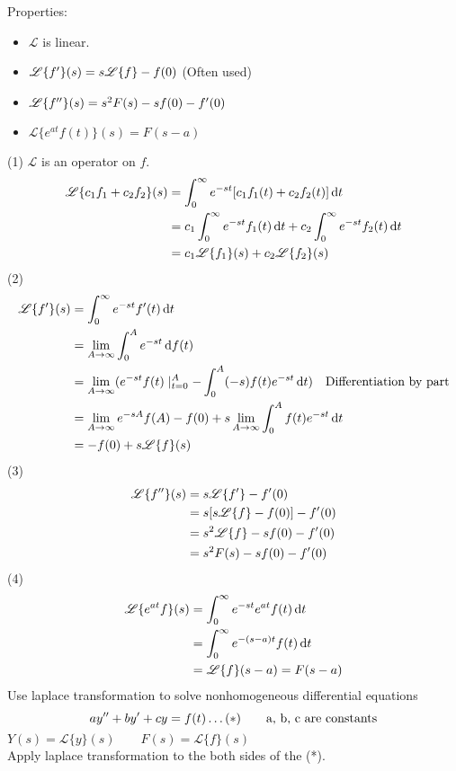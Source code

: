 Properties:
\begin{itemize}
\item $\mathscr{L}$ is linear.
\item $\mathscr{L}\{f^{\prime}\}(s)=s\mathscr{L}\{f\}-f(0)$ (Often used)
\item $\mathscr{L}\{f^{\prime\prime}\}(s)=s^2F(s)-sf(0)-f^{\prime}(0)$
\item $\mathscr{L}\{e^{at}f(t)\}(s)=F(s-a)$
\end{itemize}
(1) $\mathscr{L}$ is an operator on $f$.
\[\begin{aligned}
\mathscr{L}\{c_1f_1+c_2f_2\}(s)&=\int_0^\infty e^{-st}[c_1f_1(t)+c_2f_2(t)]\,\mathrm{d} t\\
&=c_1\int_0^\infty e^{-st}f_1(t)\,\mathrm{d} t+c_2\int_0^\infty e^{-st}f_2(t)\,\mathrm{d} t\\
&=c_1\mathscr{L}\{f_1\}(s)+c_2\mathscr{L}\{f_2\}(s)
\end{aligned}
\]
(2)
\[\begin{aligned}
\mathscr{L}\{f^{\prime}\}(s)&=\int_0^\infty e^{-st}f^{\prime}(t)\,\mathrm{d} t\\
&=\lim_{A\rightarrow\infty}\int_0^Ae^{-st}\,\mathrm{d} f(t)\\
&=\lim_{A\rightarrow\infty}(e^{-st}f(t)\mid_{t=0}^A-\int_0^A(-s)f(t)e^{-st}\,\mathrm{d} t)\quad\text{Differentiation by part}\\
&=\lim_{A\rightarrow\infty}e^{-sA}f(A)-f(0)+s\lim_{A\rightarrow\infty}\int_0^Af(t)e^{-st}\,\mathrm{d} t\\
&=-f(0)+s\mathscr{L}\{f\}(s)
\end{aligned}
\]
(3)\[\begin{aligned}
\mathscr{L}\{f^{\prime\prime}\}(s)&=s\mathscr{L}\{f^{\prime}\}-f^{\prime}(0)\\
&=s[s\mathscr{L}\{f\}-f(0)]-f^{\prime}(0)\\
&=s^2\mathscr{L}\{f\}-sf(0)-f^{\prime}(0)\\
&=s^2F(s)-sf(0)-f^{\prime}(0)
\end{aligned}
\]
(4)
\[\begin{aligned}
\mathscr{L}\{e^{at}f\}(s)&=\int_0^\infty e^{-st}e^{at}f(t)\,\mathrm{d} t\\
&=\int_0^\infty e^{-(s-a)t}f(t)\,\mathrm{d} t\\
&=\mathscr{L}\{f\}(s-a)=F(s-a)
\end{aligned}\]
 \newline
Use laplace transformation to solve nonhomogeneous differential equations
\[ay^{\prime\prime}+by^{\prime}+cy=f(t)\dots(*)\qquad\text{a, b, c are constants}
\]
$Y(s)=\mathscr{L}\{y\}(s)\qquad F(s)=\mathscr{L}\{f\}(s)$\\ 
Apply laplace transformation to the both sides of the (*).
